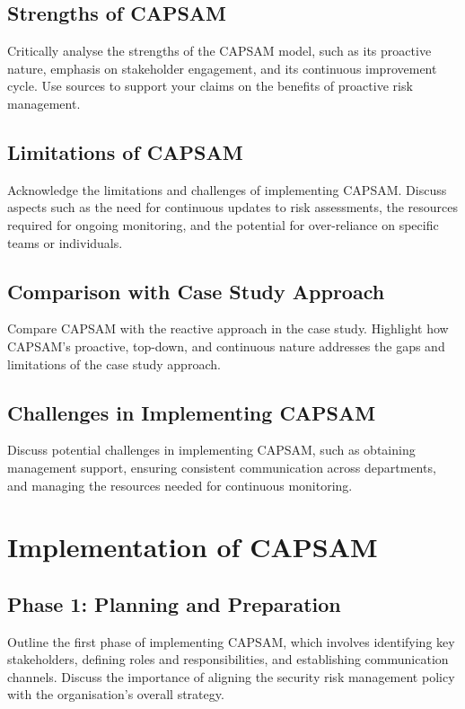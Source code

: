    \subsection{Strengths of CAPSAM}
    Critically analyse the strengths of the CAPSAM model, such as its proactive nature, emphasis on stakeholder engagement, and its continuous improvement cycle. Use sources to support your claims on the benefits of proactive risk management.

    \subsection{Limitations of CAPSAM}
    Acknowledge the limitations and challenges of implementing CAPSAM. Discuss aspects such as the need for continuous updates to risk assessments, the resources required for ongoing monitoring, and the potential for over-reliance on specific teams or individuals.

    \subsection{Comparison with Case Study Approach}
    Compare CAPSAM with the reactive approach in the case study. Highlight how CAPSAM's proactive, top-down, and continuous nature addresses the gaps and limitations of the case study approach.

    \subsection{Challenges in Implementing CAPSAM}
    Discuss potential challenges in implementing CAPSAM, such as obtaining management support, ensuring consistent communication across departments, and managing the resources needed for continuous monitoring.

\section{Implementation of CAPSAM}
    \subsection{Phase 1: Planning and Preparation}
    Outline the first phase of implementing CAPSAM, which involves identifying key stakeholders, defining roles and responsibilities, and establishing communication channels. Discuss the importance of aligning the security risk management policy with the organisation's overall strategy.

